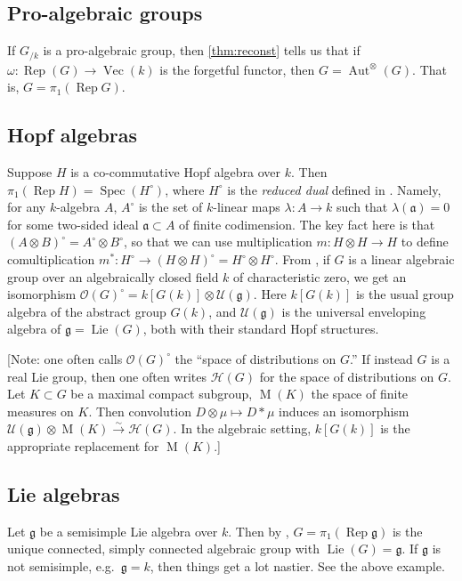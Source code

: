 \documentclass{article}
\DeclareMathOperator{\aut}{Aut}
\DeclareMathOperator{\lie}{Lie}
\DeclareMathOperator{\measures}{M}
\DeclareMathOperator{\rep}{Rep}
\DeclareMathOperator{\spec}{Spec}
\DeclareMathOperator{\vect}{Vec}
\newcommand{\cU}{\mathcal{U}}
\newcommand{\fa}{\mathfrak{a}}
\newcommand{\fg}{\mathfrak{g}}
\newcommand{\sH}{\mathscr{H}}
\newcommand{\sO}{\mathscr{O}}
\newcommand{\iso}{\xrightarrow\sim}
\begin{document}
\subsection{Pro-algebraic groups}

If $G_{/k}$ is a pro-algebraic group, then \autoref{thm:reconst} tells us that if 
$\omega:\rep(G)\to \vect(k)$ is the forgetful functor, then 
$G=\aut^\otimes(G)$. That is, $G=\pi_1(\rep G)$. 


\subsection{Hopf algebras}

Suppose $H$ is a co-commutative Hopf algebra over $k$. Then 
$\pi_1(\rep H)=\spec(H^\circ)$, where $H^\circ$ is the \emph{reduced dual} 
defined in \cite{cartier-2007}. Namely, for any $k$-algebra $A$, $A^\circ$ is 
the set of $k$-linear maps $\lambda:A\to k$ such that $\lambda(\fa)=0$ for some 
two-sided ideal $\fa\subset A$ of finite codimension. The key fact here is that 
$(A\otimes B)^\circ=A^\circ\otimes B^\circ$, so that we can use multiplication 
$m:H\otimes H\to H$ to define comultiplication 
$m^\ast:H^\circ\to (H\otimes H)^\circ=H^\circ\otimes H^\circ$. 
From \cite[II \S 6 1.1]{demazure-gabriel-1980}, if $G$ is a linear algebraic 
group over an algebraically closed field $k$ of characteristic zero, we get an 
isomorphism $\sO(G)^\circ= k[G(k)]\otimes \cU(\fg)$. Here $k[G(k)]$ is the 
usual group algebra of the abstract group $G(k)$, and $\cU(\fg)$ is the 
universal enveloping algebra of $\fg=\lie(G)$, both with their standard Hopf 
structures. 

[Note: one often calls $\sO(G)^\circ$ the ``space of distributions on $G$.'' 
If instead $G$ is a real Lie group, then one often writes $\sH(G)$ for the 
space of distributions on $G$. Let $K\subset G$ be a maximal compact subgroup, 
$\measures(K)$ the space of finite measures on $K$. Then convolution 
$D\otimes \mu\mapsto D\ast\mu$ induces an isomorphism 
$\cU(\fg)\otimes \measures(K)\iso \sH(G)$. In the algebraic setting, 
$k[G(k)]$ is the appropriate replacement for $\measures(K)$.]


\subsection{Lie algebras}

Let $\fg$ be a semisimple Lie algebra over $k$. Then by \cite{milne-2007}, 
$G=\pi_1(\rep\fg)$ is the unique connected, simply connected algebraic group 
with $\lie(G)=\fg$. If $\fg$ is not semisimple, e.g.~$\fg=k$, then things get a 
lot nastier. See the above example. 
\end{document}
